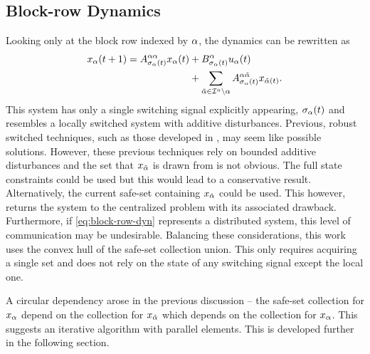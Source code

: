 \subsection{Block-row Dynamics}
Looking only at the block row indexed by $\alpha$, the dynamics can be rewritten as 
\begin{align}\label{eq:block-row-dyn}
x_\agentidx(t+1)=A^{\agentidx\agentidx}_{\ss_\agentidx(t)}x_\agentidx(t)&+B^\agentidx_{\ss_\agentidx(t)}u_\agentidx(t)\nonumber\\&+\sum_{\tilde\agentidx\in\agentidxset\setminus \agentidx}A^{\agentidx\tilde\agentidx}_{\ss_\agentidx(t)}x_{\tilde\agentidx(t)}.
\end{align}
This system has only a single switching signal explicitly appearing, ${\sigma}_{\alpha}(t)$ and resembles a locally switched system with additive disturbances. Previous, robust switched techniques, such as those developed in \cite{Lavaei2021}, may seem like possible solutions. However, these previous techniques rely on bounded additive disturbances and the set that $x_{\tilde{\alpha}}$ is drawn from is not obvious. The full state constraints could be used but this would lead to a conservative result. Alternatively, the current safe-set containing $x_{\tilde{\alpha}}$ could be used. This however, returns the system to the centralized problem with its associated drawback. Furthermore, if \autoref{eq:block-row-dyn} represents a distributed system, this level of communication may be undesirable. Balancing these considerations, this work uses the convex hull of the safe-set collection union. This only requires acquiring a single set and does not rely on the state of any switching signal except the local one. 

A circular dependency arose in the previous discussion -- the safe-set collection for $x_{\alpha}$ depend on the collection for $x_{\tilde{\alpha}}$ which depends on the collection for $x_{\alpha}$. This suggests an iterative algorithm with parallel elements. This is developed further in the following section. 